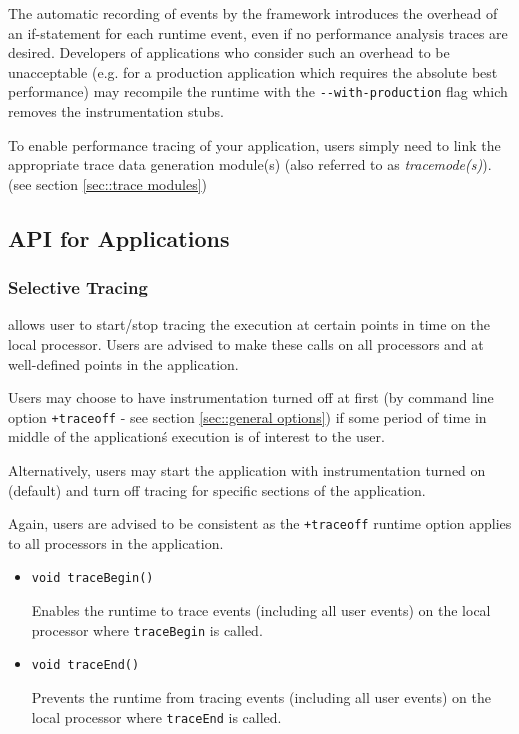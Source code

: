 \documentclass[10pt]{article}
\begin{document}
The automatic recording of events by the \projections{} framework
introduces the overhead of an if-statement for each runtime event,
even if no performance analysis traces are desired. Developers of
\charmpp{} applications who consider such an overhead to be
unacceptable (e.g. for a production application which requires the
absolute best performance) may recompile the \charmpp{} runtime with
the {\tt -{}-with-production} flag which removes the instrumentation
stubs.

To enable performance tracing of your application, users simply need
to link the appropriate trace data generation module(s) (also referred
to as {\em tracemode(s)}). (see section \ref{sec::trace modules})

\subsection{\projections{} API for \charmpp{} Applications}
\label{sec::api}

\subsubsection{Selective Tracing}
\label{sec::selective tracing}

\charmpp{} allows user to start/stop tracing the execution at certain
points in time on the local processor. Users are advised to make these
calls on all processors and at well-defined points in the application.

Users may choose to have instrumentation turned off at first (by
command line option {\tt +traceoff} - see section \ref{sec::general options}) if some period of time in middle of the
application\'s execution is of interest to the user.

Alternatively, users may start the application with instrumentation
turned on (default) and turn off tracing for specific sections of the
application.

Again, users are advised to be consistent as the {\tt +traceoff}
runtime option applies to all processors in the application.

\begin{itemize}
\item
{\tt void traceBegin()}

Enables the runtime to trace events (including all user events) on the local processor where {\tt traceBegin} is called.

\item
{\tt void traceEnd()}

Prevents the runtime from tracing events (including all user events) on the local processor where {\tt traceEnd} is called.

\end{itemize}
\end{document}
